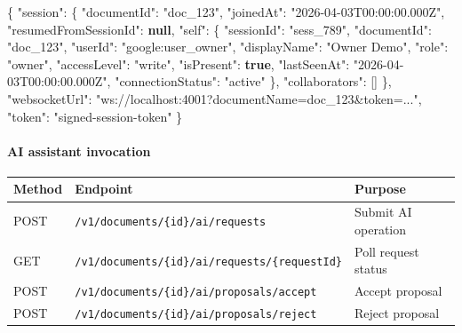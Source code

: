 \documentclass[a4paper]{article}
\newenvironment{Shaded}{}{}
\newcommand{\DataTypeTok}[1]{\textcolor[rgb]{0.56,0.13,0.00}{#1}}
\newcommand{\FunctionTok}[1]{\textcolor[rgb]{0.02,0.16,0.49}{#1}}
\newcommand{\KeywordTok}[1]{\textcolor[rgb]{0.00,0.44,0.13}{\textbf{#1}}}
\newcommand{\OtherTok}[1]{\textcolor[rgb]{0.00,0.44,0.13}{#1}}
\newcommand{\StringTok}[1]{\textcolor[rgb]{0.25,0.44,0.63}{#1}}
\begin{document}
\begin{Shaded}
\begin{Highlighting}[]
\FunctionTok{\{}
  \DataTypeTok{"session"}\FunctionTok{:} \FunctionTok{\{}
    \DataTypeTok{"documentId"}\FunctionTok{:} \StringTok{"doc\_123"}\FunctionTok{,}
    \DataTypeTok{"joinedAt"}\FunctionTok{:} \StringTok{"2026{-}04{-}03T00:00:00.000Z"}\FunctionTok{,}
    \DataTypeTok{"resumedFromSessionId"}\FunctionTok{:} \KeywordTok{null}\FunctionTok{,}
    \DataTypeTok{"self"}\FunctionTok{:} \FunctionTok{\{}
      \DataTypeTok{"sessionId"}\FunctionTok{:} \StringTok{"sess\_789"}\FunctionTok{,}
      \DataTypeTok{"documentId"}\FunctionTok{:} \StringTok{"doc\_123"}\FunctionTok{,}
      \DataTypeTok{"userId"}\FunctionTok{:} \StringTok{"google:user\_owner"}\FunctionTok{,}
      \DataTypeTok{"displayName"}\FunctionTok{:} \StringTok{"Owner Demo"}\FunctionTok{,}
      \DataTypeTok{"role"}\FunctionTok{:} \StringTok{"owner"}\FunctionTok{,}
      \DataTypeTok{"accessLevel"}\FunctionTok{:} \StringTok{"write"}\FunctionTok{,}
      \DataTypeTok{"isPresent"}\FunctionTok{:} \KeywordTok{true}\FunctionTok{,}
      \DataTypeTok{"lastSeenAt"}\FunctionTok{:} \StringTok{"2026{-}04{-}03T00:00:00.000Z"}\FunctionTok{,}
      \DataTypeTok{"connectionStatus"}\FunctionTok{:} \StringTok{"active"}
    \FunctionTok{\},}
    \DataTypeTok{"collaborators"}\FunctionTok{:} \OtherTok{[]}
  \FunctionTok{\},}
  \DataTypeTok{"websocketUrl"}\FunctionTok{:} \StringTok{"ws://localhost:4001?documentName=doc\_123\&token=..."}\FunctionTok{,}
  \DataTypeTok{"token"}\FunctionTok{:} \StringTok{"signed{-}session{-}token"}
\FunctionTok{\}}
\end{Highlighting}
\end{Shaded}

\paragraph{AI assistant invocation}\label{ai-assistant-invocation}

\begin{table}[h]
\small
\begin{tabularx}{\textwidth}{@{}L{14mm}L{72mm}Y@{}}
\toprule
Method & Endpoint & Purpose \\
\midrule
POST & \texttt{/v1/documents/\{id\}/ai/requests} & Submit AI operation \\
GET & \texttt{/v1/documents/\{id\}/ai/requests/\{requestId\}} & Poll request status \\
POST & \texttt{/v1/documents/\{id\}/ai/proposals/accept} & Accept proposal \\
POST & \texttt{/v1/documents/\{id\}/ai/proposals/reject} & Reject proposal \\
\bottomrule
\end{tabularx}
\end{table}
\end{document}

